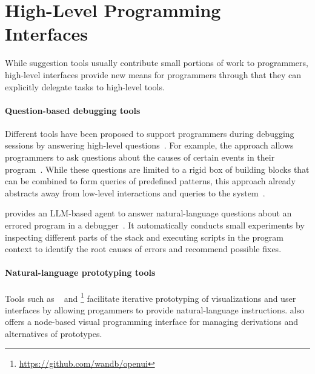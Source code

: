 
\section{High-Level Programming Interfaces}
\label{sec:related_work/interfaces}

While suggestion tools usually contribute small portions of work to programmers, high-level interfaces provide new means for programmers through that they can explicitly delegate tasks to high-level tools.

\paragraph{Question-based debugging tools}
\label{par:related_work/interfaces/debugging}

Different tools have been proposed to support programmers during debugging sessions by answering high-level questions~\cite{myers2004natural,deRoover2011soul}.
For example, the  approach allows programmers to ask questions about the causes of certain events in their program~\cite{ko2004designing}.
While these questions are limited to a rigid box of building blocks that can be combined to form queries of predefined patterns, this approach already abstracts away from low-level interactions and queries to the system~\cite{perscheid2014follow}.

 provides an LLM-based agent to answer natural-language questions about an errored program in a debugger~\cite{levin2024chatdbg}.
It automatically conducts small experiments by inspecting different parts of the stack and executing scripts in the program context to identify the root causes of errors and recommend possible fixes.

\paragraph{Natural-language prototyping tools}
\label{par:related_work/interfaces/prototyping}

Tools such as ~\cite{angert2023spellburst} and \footnote{\url{https://github.com/wandb/openui}} facilitate iterative prototyping of visualizations and user interfaces by allowing progammers to provide natural-language instructions.
 also offers a node-based visual programming interface for managing derivations and alternatives of prototypes.

